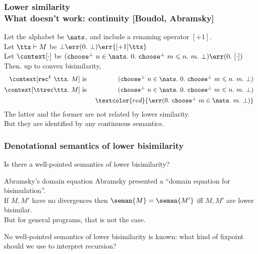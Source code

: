 \documentclass{beamer}
\newcommand{\recapp}[3]{\mathtt{rec}^{{#1}}\ {#2}}
\newcommand{\red}[1]{\textcolor{red}{#1}}
\newcommand{\blue}[1]{\textcolor{blue}{#1}}
\newcommand{\ttchoosebot}{\mathtt{choose}^{\bot}\ }
\newcommand{\rensucc}[1]{{[+1]{#1}}}
\begin{document}
\begin{frame}\frametitle{Lower similarity \\ What doesn't work: continuity [Boudol, Abramsky]}

Let the alphabet be $\nats$, and include a renaming operator $[+1]$. \\
\medskip
Let \blue{$\ttx \vdash M$} be \blue{$\bot \err ( 0.\ \bot) \err \rensucc{\ttx}$} \\
\medskip
Let \blue{$\context[\cdot]$} be \blue{$(\ttchoosebot n \in \nats.\  0.\ \ttchoosebot m\leqslant n.\  m.\ \bot) \err ( 0.\ [\cdot]) $} \\
\medskip
Then. up to convex bisimilarity,
\begin{eqnarray*}
  \context[\recapp{k}{\ttx.\ M}{}]{} & \mbox{ is } & (\ttchoosebot n \in \nats.\  0.\ \ttchoosebot m\leqslant n.\  m.\ \bot) \\
  \context[\ttrec \ttx.\ M] & \mbox{ is } & (\ttchoosebot n \in \nats.\  0.\ \ttchoosebot m\leqslant n.\  m.\ \bot) \\
& & \red{\err ( 0.\ \ttchoosebot m \in \nats.\  m.\ \bot)} 
\end{eqnarray*}
The latter and the former are not related by lower similarity. \\
\medskip
But they are identified by any continuous semantics.
  
\end{frame}



\begin{frame}\frametitle{Denotational semantics of lower bisimilarity}
 Is there a well-pointed semantics of lower bisimilarity?

 \begin{block}{Abramsky's domain equation}
   Abramsky presented a ``domain equation for bisimulation''. \\
   \medskip 
   If $M,M'$ have no divergences then $\seman{M}=\seman{M'}$ iff $M,M'$ are
   lower bisimilar. \\
   \medskip
   But for general programs, that is not the case.
\end{block}

No well-pointed semantics of lower bisimilarity is known: what kind of fixpoint should we use to interpret recursion? 
\end{frame}
\end{document}
